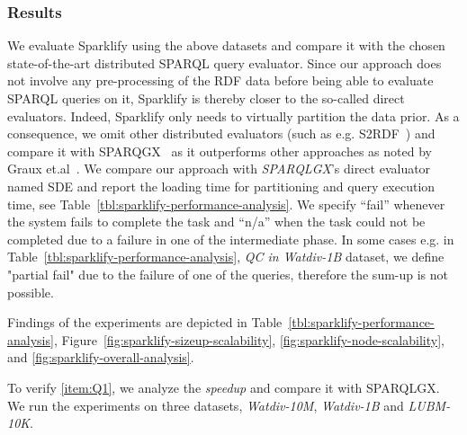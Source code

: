 \subsubsection{Results}
We evaluate Sparklify using the above datasets and compare it with the chosen state-of-the-art distributed \gls{SPARQL} query evaluator.
Since our approach does not involve any pre-processing of the \gls{RDF} data before being able to evaluate \gls{SPARQL} queries on it, Sparklify is thereby closer to the so-called direct evaluators.
Indeed, Sparklify only needs to virtually partition the data prior.
As a consequence, we omit other distributed evaluators (such as e.g. S2RDF~\cite{Schatzle:2016:SRQ:2977797.2977806}) and compare it with SPARQGX~\cite{sparqlgx-iswc-2016} as it outperforms other approaches as noted by Graux et.al~\cite{sparqlgx-iswc-2016}.
We compare our approach with \emph{SPARQLGX}'s direct evaluator named SDE and report the loading time for partitioning and query execution time, see Table~\ref{tbl:sparklify-performance-analysis}.
We specify ``fail'' whenever the system fails to complete the task and ``n/a'' when the task could not be completed due to a failure in one of the intermediate phase.
In some cases e.g. in Table~\ref{tbl:sparklify-performance-analysis}, \textit{QC in Watdiv-1B} dataset, we define "partial fail" due to the failure of one of the queries, therefore the sum-up is not possible.

Findings of the experiments are depicted in Table~\ref{tbl:sparklify-performance-analysis}, Figure~\ref{fig:sparklify-sizeup-scalability}, \ref{fig:sparklify-node-scalability}, and  \ref{fig:sparklify-overall-analysis}.

To verify \ref{item:Q1}, we analyze the \textit{speedup} and compare it with SPARQLGX.
We run the experiments on three datasets, \emph{Watdiv-10M}, \emph{Watdiv-1B} and \emph{LUBM-10K}.

